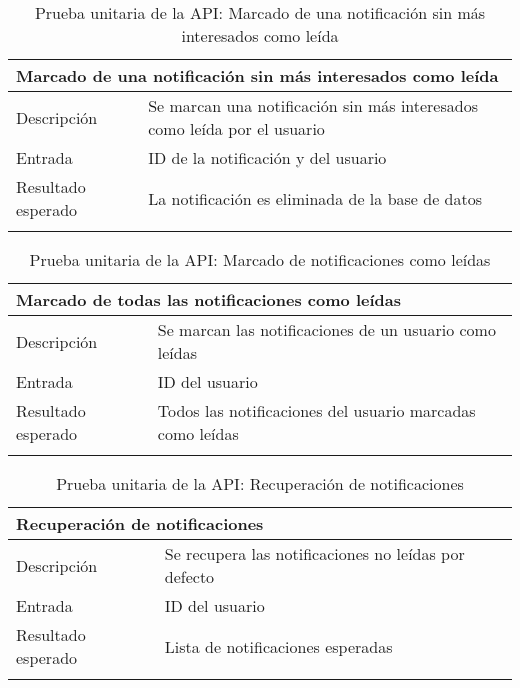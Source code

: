 \newpage
\begin{longtable}{|p{} p{}|}
    \hline
    \multicolumn{2}{|l|}{\textbf{Marcado de una notificación sin más interesados como leída}} \\ \hline 
    Descripción                 & Se marcan una notificación sin más interesados como leída por el usuario \\ \hline
    Entrada                     & ID de la notificación y del usuario \\ \hline
    Resultado esperado          & La notificación es eliminada de la base de datos \\ \hline
    \caption{Prueba unitaria de la API: Marcado de una notificación sin más interesados como leída}
    \label{cp:u:api:marcar_notificacion_compartida_leida}
\end{longtable}

\begin{longtable}{|p{} p{}|}
    \hline
    \multicolumn{2}{|l|}{\textbf{Marcado de todas las notificaciones como leídas}} \\ \hline 
    Descripción                 & Se marcan las notificaciones de un usuario como leídas \\ \hline
    Entrada                     & ID del usuario \\ \hline
    Resultado esperado          & Todos las notificaciones del usuario marcadas como leídas \\ \hline
    \caption{Prueba unitaria de la API: Marcado de notificaciones como leídas}
    \label{cp:u:api:marcar_notificaciones_leidas}
\end{longtable}

\begin{longtable}{|p{} p{}|}
    \hline
    \multicolumn{2}{|l|}{\textbf{Recuperación de notificaciones}} \\ \hline 
    Descripción                 & Se recupera las notificaciones no leídas por defecto \\ \hline
    Entrada                     & ID del usuario \\ \hline
    Resultado esperado          & Lista de notificaciones esperadas \\ \hline
    \caption{Prueba unitaria de la API: Recuperación de notificaciones}
    \label{cp:u:api:recuperar_notificaciones}
\end{longtable}

